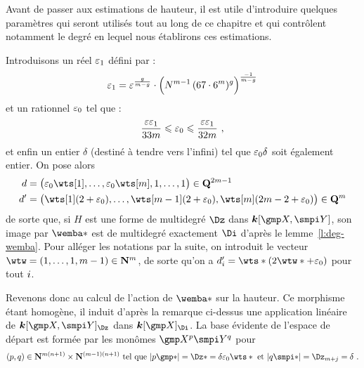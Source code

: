 Avant de passer aux estimations de hauteur, il est utile d'introduire quelques
paramètres qui seront utilisés tout au long de ce chapitre et qui contrôlent
notamment le degré en lequel nous établirons ces estimations.

Introduisons un réel \( \varepsilon\sb1 \) défini par :
\begin{equation} \label{e:def-epsi}
  \varepsilon\sb1
  =
  \varepsilon^{\frac{g}{m-g}}
  \cdot \Bigl(
    N^{m-1}
    \, (67 \cdot 6^m)^g
  \Bigr)^{\frac{-1}{m-g}}
\end{equation}
et un rationnel \( \varepsilon\sb0 \) tel que :
\begin{equation} \label{e:def-epsz}
  \frac{\varepsilon \varepsilon\sb1}{33m}
  \leqslant \varepsilon\sb0 \leqslant
  \frac{\varepsilon \varepsilon\sb1}{32m}
  \text{ ,}
\end{equation}
et enfin un entier \( \delta \) (destiné à tendre vers l'infini) tel que \(
  \varepsilon\sb0 \delta \) soit également entier. On pose alors
\begin{equation} \label{e:d-dp-def}
  \begin{aligned}
    d & = \bigl(
      \epsz \wts[1],
      \dots,
      \epsz \wts[\puiss],
      1, \dots, 1
    \bigr) \in \Q^{2\puiss-1}
    \\
    d' & = \bigl(
      \wts[1] (2 + \epsz),
      \dots,
      \wts[\puiss-1] (2 + \epsz),
      \wts[\puiss] (2\puiss - 2 + \epsz)
    \bigr) \in \Q^\puiss
  \end{aligned}
\end{equation}
de sorte que, si \( H \) est une forme de multidegré \( \Dz \) dans \(
  \cdn[\vmp, \vmpi] \), son image par \( \wemba* \) est de multidegré
exactement \( \Di \) d'après le lemme~\ref{l:deg-wemba}. Pour alléger les
notations par la suite, on introduit le vecteur \( \wtw = (1, \dots, 1, \puiss
  - 1) \in \N^\puiss \), de sorte qu'on a \( d'_\fct = \wts* (2 \wtw* + \epsz)
\) pour tout \( i \).

\medskip

Revenons donc au calcul de l'action de \( \wemba* \) sur la hauteur. Ce
morphisme étant homogène, il induit d'après la remarque ci-dessus une
application linéaire de \( \cdn [\vmp, \vmpi]_\Dz \) dans \( \cdn [\vmp]_\Di
\).  La base évidente de l'espace de départ est formée par les monômes \(
  \vmp^p \vmpi^q \) pour
\begin{equation}
  (p, q)
  \in \N^{\puiss (\dimp+1)} \times \N^{(\puiss-1) (\dimp+1)}
  \text{ tel que }
  \lgr{p\mexp*} = \Dz* = \delta \epsz \wts*
  \text{ et }
  \lgr{q\mexpi*} = \Dz_{\puiss + \fcti} = \delta
  \pmm.
\end{equation}

